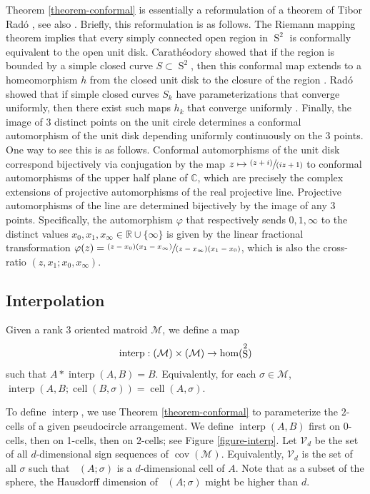 \documentclass[11pt]{article}
\numberwithin{equation}{section}
\newcommand{\pspfrac}[2]{\sfrac{(#1)}{(#2)}}
\newcommand\mto{\mathchoice{\longmapsto}{\mapsto}{\mapsto}{\mapsto}}
\theoremstyle{remark}
\let\mc\mathcal
\let\mb\mathbb
\DeclareMathOperator{\sphere}{S}
\DeclareMathOperator{\cell}{cell}
\DeclareMathOperator{\Cell}{\overline{cell}}
\DeclareMathOperator{\interp}{interp}
\DeclareMathOperator{\cov}{cov}
\begin{document}
Theorem \ref{theorem-conformal} is essentially a reformulation of a theorem of Tibor Radó \cite{rado1923representation}, see also \cite[\S II.5 Th.\,2]{goluzin1969geometric}. Briefly, this reformulation is as follows.
The Riemann mapping theorem implies that every simply connected open region in $\sphere^2$ is conformally equivalent to the open unit disk. Carathéodory showed that if the region is bounded by a simple closed curve $S \subset \sphere^2$, then this conformal map extends to a homeomorphism $h$ from the closed unit disk to the closure of the region \cite{caratheodory1913gegenseitige}. Radó showed that if simple closed curves $S_k$ have parameterizations that converge uniformly, then there exist such maps $h_k$ that converge uniformly \cite{rado1923representation}. Finally, the image of $3$ distinct points on the unit circle determines a conformal automorphism of the unit disk depending uniformly continuously on the $3$ points. One way to see this is as follows. Conformal automorphisms of the unit disk correspond bijectively via conjugation by the map $z \mto \pspfrac{z+i}{iz+1}$ to conformal automorphisms of the upper half plane of $\mb{C}$,
which are precisely the complex extensions of projective automorphisms of the real projective line. Projective automorphisms of the line are determined bijectively by the image of any $3$ points.
Specifically, the automorphism $\varphi$ that respectively sends $0,1,\infty$ to the distinct values $x_0,x_1,x_\infty \in \mb{R}\cup\{\infty\}$ is given by the linear fractional transformation
$\varphi(z) = \sfrac{(z-x_0)(x_1-x_\infty)}{(z-x_\infty)(x_1-x_0)}$, which is also the cross-ratio $(z,x_1;x_0,x_\infty)$.

\subsection{Interpolation}

Given a rank $3$ oriented matroid $\mc{M}$, we define a map
\[ \interp : \real(\mc{M}) \times \real(\mc{M}) \to \hom(\sphere^2) \]
such that $A*\interp(A,B)\!=\! B$.
Equivalently, for each $\sigma \!\in\! \mc{M}$, $\interp(A,B;\cell(B,\sigma))\!=\!\cell(A,\sigma)$.

To define $\interp$, we use Theorem \ref{theorem-conformal} to parameterize the $2$-cells of a given pseudocircle arrangement.
We define $\interp(A,B)$ first on 0-cells, then on 1-cells, then on $2$-cells; see Figure \ref{figure-interp}. Let $\mc{V}_d$ be the set of all $d$-dimensional sign sequences of $\cov(\mc{M})$. Equivalently, $\mc{V}_d$ is the set of all $\sigma$ such that $\Cell(A;\sigma)$ is a $d$-dimensional cell of $A$.
Note that as a subset of the sphere, the Hausdorff dimension of $\Cell(A;\sigma)$ might be higher than $d$.
\end{document}
